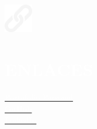 \documentclass[../main.tex]{subfiles}
\begin{document}
    \hspace*{0.4cm}
    \begin{minipage}[t]{1.75cm}
        \vspace*{1.5cm}\includegraphics[width=1.25cm]{assets/link.png}
    \end{minipage}
    \begin{minipage}[t]{5cm}

        \vspace*{0.75cm}
        \section*{\textcolor{white}{ENLACES}}
        \vspace*{-0.25cm}
        \textcolor{white}{
            \vspace*{0.1cm}\underline{\href{https://albatalaya.github.io/}{\textcolor{white}{Portafolio Personal}}}\\
            \vspace*{0.1cm}\underline{\href{https://www.github.com/albatalaya}{\textcolor{white}{GitHub}}}\\
            \underline{\href{https://www.linkedin.com/in/albatalaya}{\textcolor{white}{LinkedIn}}}
        }
    \end{minipage}
\end{document}

